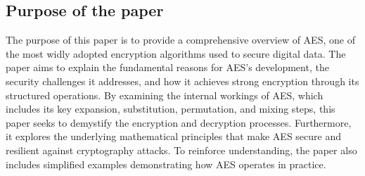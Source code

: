\subsection{Purpose of the paper}

The purpose of this paper is to provide a comprehensive overview of \gls{AES}, one of the most widly adopted encryption algorithms used to secure digital data.
The paper aims to explain the fundamental reasons for \gls{AES}'s development, the security challenges it addresses, and how it achieves strong encryption through its structured operations. 
By examining the internal workings of \gls{AES}, which includes its key expansion, substitution, permutation, and mixing steps, this paper seeks to demystify the encryption and decryption processes.
Furthermore, it explores the underlying mathematical principles that make \gls{AES} secure and resilient against cryptography attacks.
To reinforce understanding, the paper also includes simplified examples demonstrating how AES operates in practice. 